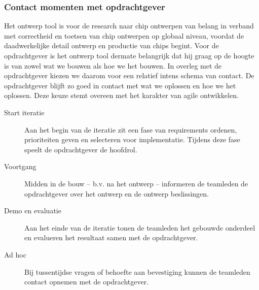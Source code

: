 \subsubsection{Contact momenten met opdrachtgever}
Het ontwerp tool is voor de research naar chip ontwerpen van belang in verband met correctheid en toetsen van chip ontwerpen op
globaal niveau, voordat de daadwerkelijke detail ontwerp en productie van chips begint. Voor de opdrachtgever is het ontwerp tool dermate belangrijk dat
hij graag op de hoogte is van zowel wat we bouwen als hoe we het bouwen.
In overleg met de opdrachtgever kiezen we daarom voor een relatief intens schema van contact. De opdrachtgever blijft zo goed in contact met wat we oplossen en
hoe we het oplossen. Deze keuze stemt overeen met het karakter van agile ontwikkelen.
\begin{description}
    \item[Start iteratie] Aan het begin van de iteratie zit een fase van requirements ordenen, prioriteiten geven en selecteren voor implementatie.
    Tijdens deze fase speelt de opdrachtgever de hoofdrol.
    \item[Voortgang] Midden in de bouw -- b.v. na het ontwerp -- informeren de teamleden de opdrachtgever over het ontwerp en de ontwerp beslissingen.
    \item[Demo en evaluatie] Aan het einde van de iteratie tonen de teamleden het gebouwde onderdeel en evalueren het resultaat samen met de opdrachtgever.
    \item[Ad hoc] Bij tussentijdse vragen of behoefte aan bevestiging kunnen de teamleden contact opnemen met de opdrachtgever.
\end{description}